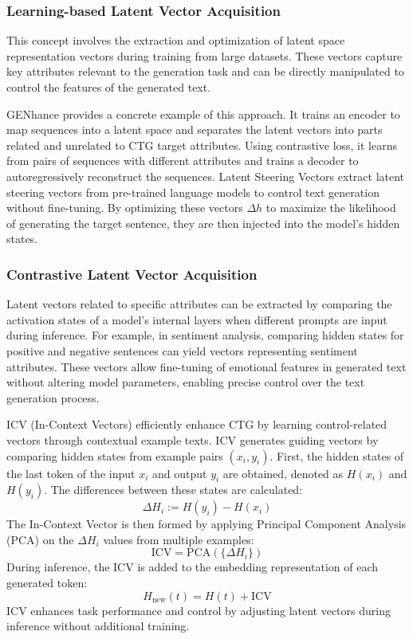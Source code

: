 \documentclass[acmsmall, screen]{acmart}
\begin{document}
\subsubsection{\textbf{Learning-based Latent Vector Acquisition}} 
This concept involves the extraction and optimization of latent space representation vectors during training from large datasets. These vectors capture key attributes relevant to the generation task and can be directly manipulated to control the features of the generated text.

GENhance \cite{chan_nips21_GENhance} provides a concrete example of this approach. It trains an encoder to map sequences into a latent space and separates the latent vectors into parts related and unrelated to CTG target attributes. Using contrastive loss, it learns from pairs of sequences with different attributes and trains a decoder to autoregressively reconstruct the sequences.
Latent Steering Vectors \cite{subramani_acl22_LatentStreeringVectors} extract latent steering vectors from pre-trained language models to control text generation without fine-tuning. By optimizing these vectors \( \Delta h \) to maximize the likelihood of generating the target sentence, they are then injected into the model's hidden states.

\subsubsection{\textbf{Contrastive Latent Vector Acquisition}} 
Latent vectors related to specific attributes can be extracted by comparing the activation states of a model's internal layers when different prompts are input during inference. For example, in sentiment analysis, comparing hidden states for positive and negative sentences can yield vectors representing sentiment attributes. These vectors allow fine-tuning of emotional features in generated text without altering model parameters, enabling precise control over the text generation process.

ICV (In-Context Vectors) \cite{liu_arxiv24_ICV} efficiently enhance CTG by learning control-related vectors through contextual example texts. ICV generates guiding vectors by comparing hidden states from example pairs \((x_i, y_i)\). First, the hidden states of the last token of the input \(x_i\) and output \(y_i\) are obtained, denoted as \(H(x_i)\) and \(H(y_i)\). The differences between these states are calculated:
\begin{equation}
\Delta H_i := H(y_i) - H(x_i)
\end{equation}
The In-Context Vector is then formed by applying Principal Component Analysis (PCA) on the \(\Delta H_i\) values from multiple examples:
\begin{equation}
\text{ICV} = \text{PCA}(\{\Delta H_i\})
\end{equation}
During inference, the ICV is added to the embedding representation of each generated token:
\begin{equation}
H_{\text{new}}(t) = H(t) + \text{ICV}
\end{equation}
ICV enhances task performance and control by adjusting latent vectors during inference without additional training.
\end{document}
